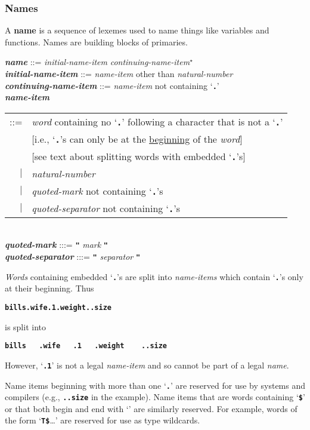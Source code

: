 \documentclass[12pt]{article}
\newcommand{\TT}[1]{{\tt \bfseries #1}}
\newcommand{\STAR}{{\Large $^\star$}}
\newcommand{\key}[1]{{\rm \bfseries #1}}
\newcommand{\emkey}[1]{{\em \bfseries #1}}
\newenvironment{indpar}[1][0.3in]%
	{\begin{list}{}%
		     {\setlength{\itemsep}{0in}%
		      \setlength{\topsep}{0in}%
		      \setlength{\parsep}{1ex}%
		      \setlength{\labelwidth}{#1}%
		      \setlength{\leftmargin}{#1}%
		      \addtolength{\leftmargin}{\labelsep}}%
	 \item}%
	{\end{list}}
\begin{document}
\subsubsection{Names}
\label{NAMES}

A \key{name} is a sequence of lexemes used to name things like
variables and functions.  Names are building blocks of primaries.

\begin{indpar}
\emkey{name}\label{NAME} ::=
    {\em initial-name-item} {\em continuing-name-item}\STAR{} \\
\emkey{initial-name-item} ::= {\em name-item} other than {\em natural-number} \\
\emkey{continuing-name-item} ::= {\em name-item} not containing `\TT{.}' \\
\emkey{name-item}\label{NAME-ITEM}
    \begin{tabular}[t]{@{}rl}
    ::= & {\em word} containing no `\TT{.}' following a character
                     that is not a `\TT{.}' \\
        & [i.e., `\TT{.}'s can only be at the \underline{beginning}
	   of the {\em word}] \\
        & [see text about splitting words with embedded `\TT{.}'s] \\
    $|$ & {\em natural-number} \\
    $|$ & {\em quoted-mark} not containing `\TT{.}'s \\
    $|$ & {\em quoted-separator} not containing `\TT{.}'s \\
    \end{tabular} \\
\emkey{quoted-mark} :::= \TT{"} {\em mark} \TT{"} \\
\emkey{quoted-separator} :::= \TT{"} {\em separator} \TT{"}
\end{indpar}

{\em Words} containing embedded `\TT{.}'s are split into
{\em name-items} which contain `\TT{.}'s only at their beginning.
Thus
\begin{center}
\TT{bills.wife.1.weight..size}
\end{center}
is split into
\begin{center}
\TT{bills~~~.wife~~~.1~~~.weight~~~~..size}
\end{center}
However, `\TT{.1}' is not a legal {\em name-item} and so cannot
be part of a legal {\em name}.

Name items beginning with more than one `\TT{.}' are reserved
for use by systems and compilers (e.g., \TT{..size} in the example).
Name items that are words containing `\TT{\$}' or that both
begin and end with `\TT{*}' are
similarly reserved.  For example, words of the form `\TT{T\$}\ldots'
are reserved for use as type wildcards.
\end{document}
